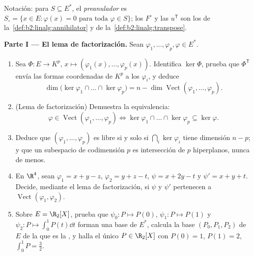 \begin{problem}
\label{pb:b2:linalg:1}
Notación: para $S \subseteq E^*$, el \emph{preanulador} es $S_\circ
= \{x \in E : \varphi(x) = 0 \text{ para toda } \varphi \in S\}$;
los  $F^\circ$ y las  $u^{\mathsf T}$ son
los de la~\cref{def:b2:linalg:annihilator} y de la~\cref{def:b2:linalg:transpose}.

\medskip
\noindent\textbf{Parte I --- El lema de factorización.} Sean
$\varphi_1, \dots, \varphi_p, \varphi \in E^*$.
\begin{enumerate}
  \item Sea $\Phi \colon E \to K^p$, $x \mapsto (\varphi_1(x),
        \dots, \varphi_p(x))$. Identifica $\ker\Phi$, prueba que
        $\Phi^{\mathsf T}$ envía las formas coordenadas de $K^p$ a
        los $\varphi_i$, y deduce
        \[
        \dim \bigl(\ker\varphi_1 \cap \dots \cap
        \ker\varphi_p\bigr) = n - \dim
        \operatorname{Vect}(\varphi_1, \dots, \varphi_p).
        \]
  \item (Lema de factorización) Demuestra la equivalencia:
        \[
        \varphi \in \operatorname{Vect}(\varphi_1, \dots,
        \varphi_p)
        \iff
        \ker\varphi_1 \cap \dots \cap \ker\varphi_p \subseteq
        \ker\varphi .
        \]
  \item Deduce que $(\varphi_1, \dots, \varphi_p)$ es libre si y
        solo si $\bigcap_i \ker\varphi_i$ tiene dimensión $n - p$;
        y que un subespacio de codimensión $p$ es intersección de
        $p$ hiperplanos, nunca de menos.
  \item En $\R^4$, sean $\varphi_1 = x + y - z$, $\varphi_2 = y + z
        - t$, $\psi = x + 2y - t$ y $\psi' = x + y + t$. Decide,
        mediante el lema de factorización, si $\psi$ y $\psi'$
        pertenecen a $\operatorname{Vect}(\varphi_1, \varphi_2)$.
  \item Sobre $E = \R_2[X]$, prueba que $\psi_0 \colon P \mapsto
        P(0)$, $\psi_1 \colon P \mapsto P(1)$ y $\psi_2 \colon P
        \mapsto \int_0^1 P(t)\dd t$ forman una base de $E^*$,
        calcula la base $(P_0, P_1, P_2)$ de $E$ de la que es la
        , y halla el único $P \in \R_2[X]$ con $P(0) = 1$,
        $P(1) = 2$, $\int_0^1 P = \frac32$.
\end{enumerate}


\end{problem}
